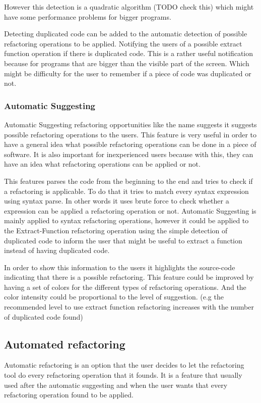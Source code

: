 However this detection is a quadratic algorithm (TODO check this) which might
have some performance problems for bigger programs.

Detecting duplicated code can be added to the automatic detection of possible refactoring operations to be applied.
Notifying the users of a possible extract function operation if there is duplicated code.
This is a rather useful notification because for programs that are bigger than the
visible part of the screen.
Which might be difficulty for the user to remember if a piece of code was duplicated or not.



\subsubsection{Automatic Suggesting}
Automatic Suggesting refactoring opportunities like the name suggests it suggests
possible refactoring operations to the users.
This feature is very useful in order to have a general idea what possible refactoring
operations can be done in a piece of software.
It is also important for inexperienced users because with this,
they can have an idea what refactoring operations can be applied or not.


This features parses the code from the beginning to the end and tries to check
if a refactoring is applicable.
To do that it tries to match every syntax expression using syntax parse.
In other words it uses brute force to check whether a expression can be applied
a refactoring operation or not.
Automatic Suggesting is mainly applied to syntax refactoring operations, however
it could be applied to the Extract-Function refactoring operation using the
simple detection of duplicated code to inform the user that might be useful
to extract a function instead of having duplicated code.

In order to show this information to the users it highlights the source-code indicating
that there is a possible refactoring.
This feature could be improved by having a set of colors for the different types
of refactoring operations. And the color intensity could be proportional to the level
of suggestion. (e.g the recommended level to use extract function refactoring
increases with the number of duplicated code found)


\subsection{Automated refactoring}
Automatic refactoring is an option that the user decides to let the refactoring
tool do every refactoring operation that it founds. It is a feature that usually used
after the automatic suggesting and when the user wants that every refactoring operation
found to be applied.

